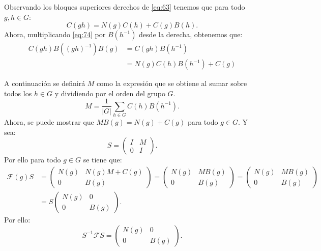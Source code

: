 \documentclass[12pt]{book}
\theoremstyle{definition}
\newcounter{in}
\newcounter{ini}
\begin{document}
Observando los bloques superiores derechos de \ref{eq:63} tenemos que
para todo $g,h \in G$:
\begin{equation}
  \label{eq:74}
  C(gh)=N(g)C(h)+C(g)B(h). 
\end{equation}
Ahora, multiplicando \ref{eq:74} por $B(h^{-1})$ desde la derecha,
obtenemos que:
\begin{equation}
  \label{eq:75}
  \begin{aligned}
C(gh)B((gh)^{-1})B(g) &= C(gh)B(h^{-1}) \\
&= N(g)C(h)B(h^{-1})+C(g)
    \end{aligned}
\end{equation}

A continuación se definirá $M$ como la expresión que se obtiene al
sumar sobre todos los $h \in G$ y dividiendo por el orden del grupo
$G$.
\begin{equation}
  \label{eq:76}
  M=\frac{1}{|G|} \sum_{h \in G} C(h)B(h^{-1}).
\end{equation}
Ahora, se puede mostrar que $MB(g)=N(g)+C(g)$ para todo $g \in G$. Y sea:
\begin{equation}
  \label{eq:77}
   S =
    \begin{pmatrix}
    I & M \\
    0 & I
  \end{pmatrix}.
\end{equation}
Por ello para todo $g \in G$ se tiene que:
\begin{equation}
  \label{eq:78}
    \begin{aligned}
  \mathcal{F}(g)S &=
  \begin{pmatrix}
    N(g) & N(g)M+C(g) \\
    0 & B(g)
  \end{pmatrix}
  =
    \begin{pmatrix}
    N(g) & MB(g) \\
    0 & B(g)
  \end{pmatrix}
  =
    \begin{pmatrix}
    N(g) & MB(g) \\
    0 & B(g)
  \end{pmatrix} \\
  & = S
    \begin{pmatrix}
    N(g) & 0 \\
    0 & B(g)
  \end{pmatrix}.
\end{aligned}
\end{equation}
Por ello:
\begin{equation}
  \label{eq:79}
  S^{-1}\mathcal{F}S=
    \begin{pmatrix}
    N(g) & 0 \\
    0 & B(g)
  \end{pmatrix}.
\end{equation}
\end{document}
